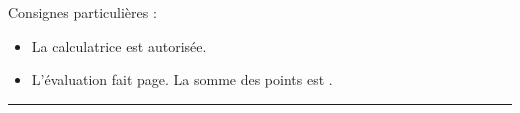 

\SetDate[11/03/2026]

\reversemarginpar
\setlength{\marginparsep}{.5cm}


\pagestyle{fancy}
\fancyhead[R]{\today}

Consignes particulières : 
\begin{itemize}[label=$\bullet$]
	\item 
	La calculatrice est {autorisée}.
	\item
	L'évaluation fait \pageref{lastpage} page. La somme des points est .
\end{itemize}

\marginpar{[pts]}
\hrule


